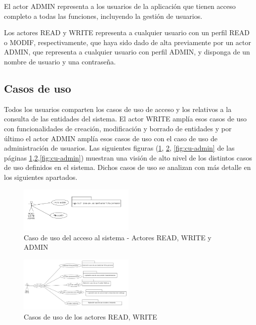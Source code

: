 El actor ADMIN representa a los usuarios de la aplicación que tienen
acceso completo a todas las funciones, incluyendo la gestión de usuarios.

Los actores  READ y  WRITE representa a cualquier usuario con un perfil READ o MODIF, respectivamente, que haya sido dado de alta previamente por un actor ADMIN, que representa a cualquier usuario con perfil ADMIN, y disponga de un nombre de usuario y una contraseña.




\subsection{Casos de uso}
\label{sub:casos-uso}


Todos los usuarios comparten los casos de uso de acceso y los relativos a la consulta de las entidades del sistema. El actor WRITE amplía esos casos de uso con funcionalidades de creación, modificación y borrado de entidades y por último el actor ADMIN amplía esos casos de uso con el caso de uso de administración de usuarios. Las siguientes figuras (\ref{fig:cu-acceso}, \ref{fig:cu-read-write}, \ref{fig:cu-admin} de las páginas \ref{fig:cu-acceso},\ref{fig:cu-read-write},\ref{fig:cu-admin}) muestran una visión de alto nivel de los distintos casos de uso definidos en el sistema. Dichos casos de uso se analizan con más detalle en los siguientes apartados.


\begin{figure}[hp!]
  \centering
  \includegraphics[width=0.50\textwidth]{imaxes/cu_acceso.png}
  \caption{Caso de uso del acceso al sistema - Actores READ, WRITE y ADMIN}
  \label{fig:cu-acceso}
\end{figure}



\begin{figure}[hp!]
  \centering
  \includegraphics[width=0.50\textwidth]{imaxes/cu-read-write.png}
  \caption{Casos de uso de los actores READ, WRITE}
  \label{fig:cu-read-write}
\end{figure}


